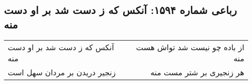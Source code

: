\begin{center}
\section*{رباعی شماره ۱۵۹۴: آنکس که ز دست شد بر او دست منه}
\label{sec:1594}
\begin{longtable}{l p{0.5cm} r}
آنکس که ز دست شد بر او دست منه
&&
از باده چو نیست شد تواش هست منه
\\
زنجیر دریدن بر مردان سهل است
&&
هر زنجیری بر شتر مست منه
\\
\end{longtable}
\end{center}
